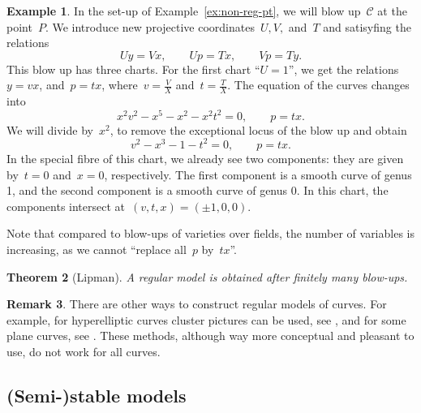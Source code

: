 \documentclass[12pt]{article}
\newtheorem{theorem}{Theorem}[section]
\theoremstyle{definition}
\newtheorem{remark}[theorem]{Remark}
\newtheorem{example}[theorem]{Example}
\numberwithin{equation}{subsection}
\begin{document}
\begin{example}
In the set-up of Example~\ref{ex:non-reg-pt}, we will blow up~$\mathcal{C}$ at the point~$P$.
We introduce new projective coordinates~$U, V,$ and~$T$ and satisyfing the relations~$$Uy = Vx, \qquad Up = Tx, \qquad Vp = Ty.$$
This blow up has three charts.
For the first chart ``$U = 1$'', we get the relations~$y = vx$, and~$p = tx$, where~$v = \frac{V}{X}$ and~$t = \frac{T}{X}$. The equation of the curves changes into
$$x^2v^2 - x^5 - x^2 - x^2t^2 = 0, \qquad p = tx.$$
We will divide by~$x^2$, to remove the exceptional locus of the blow up and obtain
$$v^2 - x^3 - 1 - t^2 = 0, \qquad p = tx.$$
In the special fibre of this chart, we already see two components: they are given by~$t = 0$ and~$x = 0$, respectively.
The first component is a smooth curve of genus 1, and the second component is a smooth curve of genus 0.
In this chart, the components intersect at~$(v,t,x) = (\pm 1, 0 , 0)$.


Note that compared to blow-ups of varieties over fields, the number of variables is increasing, as we cannot ``replace all~$p$ by~$tx$''.
\end{example}

\begin{theorem}[Lipman]
A regular model is obtained after finitely many blow-ups.
\end{theorem}

\begin{remark}
There are other ways to construct regular models of curves. For example, for hyperelliptic curves cluster pictures can be used, see \cite{HyperUser}, and for some plane curves, see \cite{Deltavregular}. These methods, although way more conceptual and pleasant to use, do not work for all curves.
\end{remark}

\subsection{(Semi-)stable models}
\end{document}
